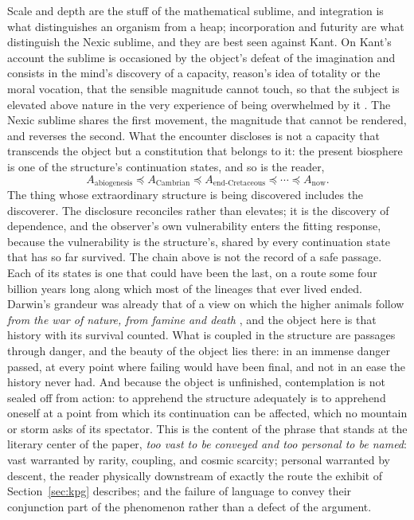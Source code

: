 \noindent Scale and depth are the stuff of the mathematical sublime, and
integration is what distinguishes an organism from a heap; incorporation and
futurity are what distinguish the Nexic sublime, and they are best seen
against Kant. On Kant's account the sublime is occasioned by the object's
defeat of the imagination and consists in the mind's discovery of a capacity, reason's
idea of totality or the moral vocation, that the sensible magnitude cannot
touch, so that the subject is elevated above nature in the very experience of
being overwhelmed by it \cite{Kant1790}. The Nexic sublime shares the first
movement, the magnitude that cannot be rendered, and reverses the second. What
the encounter discloses is not a capacity that transcends the object but a
constitution that belongs to it: the present biosphere is one of the
structure's continuation states, and so is the reader,
\[
A_{\mathrm{abiogenesis}}\preceq A_{\mathrm{Cambrian}}\preceq
A_{\mathrm{end\text{-}Cretaceous}}\preceq\cdots\preceq A_{\mathrm{now}}.
\]
The thing whose extraordinary structure is being discovered includes the
discoverer. The disclosure reconciles rather than elevates; it is the
discovery of dependence, and the observer's own vulnerability enters the
fitting response, because the vulnerability is the structure's, shared by
every continuation state that has so far survived.
The chain above is not the record of a safe passage. Each of its states
is one that could have been the last, on a route some four billion years
long along which most of the lineages that ever lived ended. Darwin's
grandeur was already that of a view on which the higher animals follow
\emph{from the war of nature, from famine and death} \cite{Darwin1859},
and the object here is that history with its survival counted. What is
coupled in the structure are passages through danger, and the beauty of
the object lies there: in an immense danger passed, at every point where
failing would have been final, and not in an ease the history never had.
And because the object is
unfinished, contemplation is not sealed off from action: to apprehend the
structure adequately is to apprehend oneself at a point from which its
continuation can be affected, which no mountain or storm asks of its
spectator. This is the content of the phrase that stands at the literary
center of the paper, \emph{too vast to be conveyed and too personal to be
named}: vast warranted by rarity, coupling, and cosmic scarcity; personal
warranted by descent, the reader physically downstream of exactly the route
the exhibit of Section~\ref{sec:kpg} describes; and the failure of language
to convey their conjunction part of the phenomenon rather than a defect of
the argument.

